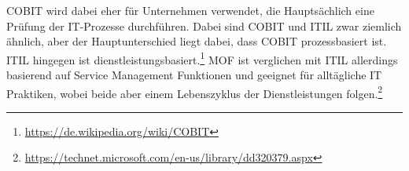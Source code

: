 \noindent
\newline
COBIT wird dabei eher für Unternehmen verwendet, die Hauptsächlich
 eine Prüfung der IT-Prozesse durchführen. Dabei sind COBIT und ITIL zwar ziemlich
 ähnlich, aber der Hauptunterschied liegt dabei, dass COBIT prozessbasiert ist.
 ITIL hingegen ist dienstleistungsbasiert.\footnote{\url{https://de.wikipedia.org/wiki/COBIT}}
\newline
MOF ist verglichen mit ITIL allerdings basierend auf Service Management Funktionen
und geeignet für alltägliche IT Praktiken, wobei beide aber einem Lebenszyklus 
der Dienstleistungen folgen.\footnote{\url{https://technet.microsoft.com/en-us/library/dd320379.aspx}}
